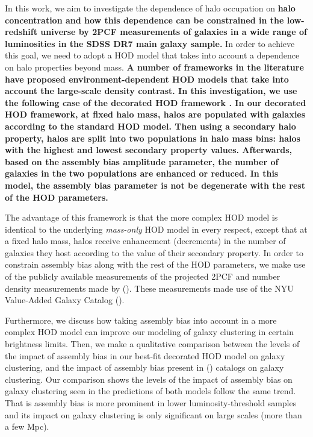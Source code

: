 \documentclass[twocolumn]{aastex61}
\begin{document}
In this work, we aim to investigate the dependence of halo occupation on 
{\bf \color{dred} 
    halo concentration and how this dependence can be constrained in the low-redshift universe by 2PCF measurements of galaxies in a wide range of luminosities in the SDSS DR7 main galaxy sample. 
}
In order to achieve this goal, we need to adopt a HOD model that takes into account 
a dependence on halo properties beyond mass. 
{\bf \color{red} 
    A number of frameworks in the literature \citep{edHOD-tinker,edHOD-gillmartin,edHOD-weinberg} 
    have proposed environment-dependent HOD models that take into account the large-scale density contrast. 
    In this investigation, we use the following case of the decorated HOD framework \citep{decorated}.  
    In our decorated HOD framework, at fixed halo mass, halos are populated with galaxies according to 
    the standard HOD model. Then using a secondary halo property, halos are split into two populations
    in halo mass bins: halos with the highest and lowest secondary property values. Afterwards, based
    on the assembly bias amplitude parameter, the number of galaxies in the two populations are enhanced
    or reduced. In this model, the assembly bias parameter is not be degenerate with the rest of the HOD 
    parameters. 
}

The advantage of this framework is that the more complex HOD model is identical to the underlying \emph{mass-only} HOD model in every respect, except that at a fixed halo mass, halos receive enhancement (decrements) in the number of galaxies they host according to the value of their secondary property. In order to constrain assembly bias along with the rest of the HOD parameters, we make use of the publicly available measurements of the projected 2PCF and number density measurements made by   
(\citealt{guo2015}). These measurements made use of the NYU Value-Added Galaxy Catalog (\citealt{Blanton2005}).

Furthermore, we discuss how taking assembly bias into account in a more complex HOD model can improve our modeling of galaxy clustering in certain brightness limits. Then, we make a qualitative comparison between the levels of the impact of assembly bias in our best-fit decorated HOD model on galaxy clustering, and the impact of assembly bias present in (\citealt{hw2013}) catalogs on galaxy clustering. Our comparison shows the levels of the impact of assembly bias on galaxy clustering seen in the predictions of both models follow the same trend. That is assembly bias is more prominent in lower luminosity-threshold samples and its impact on galaxy clustering is only significant on large scales (more than a few Mpc).
\end{document}
